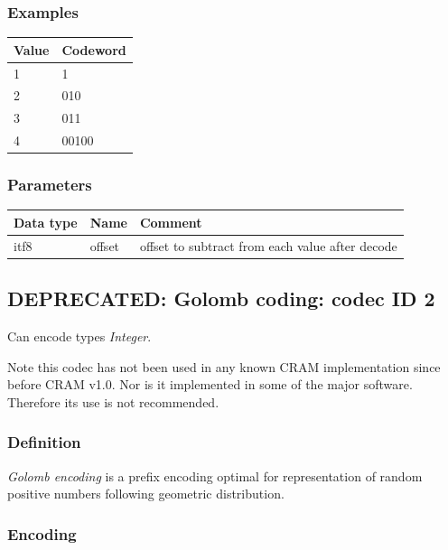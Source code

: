 \documentclass[a4paper]{article}
\begin{document}
\subsubsection*{Examples}

\begin{tabular}{|>{\raggedright}p{76pt}|>{\raggedright}p{107pt}|}
\hline
\textbf{Value} & \textbf{Codeword}\tabularnewline
\hline
1 & 1\tabularnewline
\hline
2 & 010\tabularnewline
\hline
3 & 011\tabularnewline
\hline
4 & 00100\tabularnewline
\hline
\end{tabular}

\subsubsection*{Parameters}

\begin{tabular}{|>{\raggedright}p{144pt}|>{\raggedright}p{144pt}|>{\raggedright}p{144pt}|}
\hline
\textbf{Data type} & \textbf{Name} & \textbf{Comment}\tabularnewline
\hline
itf8 & offset & offset to subtract from each value after decode\tabularnewline
\hline
\end{tabular}

\subsection{DEPRECATED: Golomb coding: codec ID 2}

Can encode types \textit{Integer}.

Note this codec has not been used in any known CRAM implementation since before CRAM v1.0.
Nor is it implemented in some of the major software.
Therefore its use is not recommended.

\subsubsection*{Definition}

\emph{Golomb encoding} is a prefix encoding optimal for representation of random 
positive numbers following geometric distribution. 

\subsubsection*{Encoding}
\end{document}

